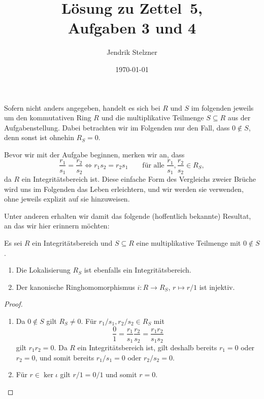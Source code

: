 \documentclass[a4paper,10pt,numbers=noenddot]{scrartcl}
\title{Lösung zu Zettel~5, \\ Aufgaben 3 und 4}
\author{Jendrik Stelzner}
\date{\today}
\begin{document}
\maketitle

\addtocounter{section}{2}










\section{}

Sofern nicht anders angegeben, handelt es sich bei $R$ und $S$ im folgenden jeweils um den kommutativen Ring $R$ und die multiplikative Teilmenge $S \subseteq R$ aus der Aufgabenstellung.
Dabei betrachten wir im Folgenden nur den Fall, dass $0 \notin S$, denn sonst ist ohnehin $R_S = 0$.

Bevor wir mit der Aufgabe beginnen, merken wir an, dass
\[
        \frac{r_1}{s_1} = \frac{r_2}{s_2}
  \iff  r_1 s_2 = r_2 s_1
  \qquad
  \text{für alle $\frac{r_1}{s_1}, \frac{r_2}{s_2} \in R_S$},
\]
da $R$ ein Integritätsbereich ist.
Diese einfache Form des Vergleichs zweier Brüche wird uns im Folgenden das Leben erleichtern, und wir werden sie verwenden, ohne jeweils explizit auf sie hinzuweisen.

Unter anderen erhalten wir damit das folgende (hoffentlich bekannte) Resultat, an das wir hier erinnern möchten:
\begin{lemma}
  \label{lemma: localization of integral domains}
  Es sei $R$ ein Integritätsbereich und $S \subseteq R$ eine multiplikative Teilmenge mit $0 \notin S$.
  \begin{enumerate}
    \item
      Die Lokalisierung $R_S$ ist ebenfalls ein Integritätsbereich.
    \item
      Der kanonische Ringhomomorphismus $i \colon R \to R_S$, $r \mapsto r/1$ ist injektiv.
  \end{enumerate}
\end{lemma}
\begin{proof}
  \begin{enumerate}
    \item
      Da $0 \notin S$ gilt $R_S \neq 0$.
      Für $r_1/s_1, r_2/s_2 \in R_S$ mit
      \[
          \frac{0}{1}
        = \frac{r_1}{s_1} \frac{r_2}{s_2}
        = \frac{r_1 r_2}{s_1 s_2}
      \]
      gilt $r_1 r_2 = 0$.
      Da $R$ ein Integritätsbereich ist, gilt deshalb bereits $r_1 = 0$ oder $r_2 = 0$, und somit bereits $r_1/s_1 = 0$ oder $r_2/s_2 = 0$.
    \item
      Für $r \in \ker \iota$ gilt $r/1 = 0/1$ und somit $r = 0$.
  \end{enumerate}
\end{proof}
\end{document}

